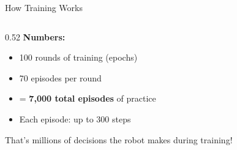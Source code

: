 \documentclass[aspectratio=169, 11pt]{beamer}
\begin{document}
\begin{frame}{How Training Works}
\begin{columns}[T]
\begin{column}{0.52\textwidth}
      \vspace{0.3em}
      \textbf{Numbers:}
      \begin{itemize}\small
        \item 100 rounds of training (epochs)
        \item 70 episodes per round
        \item = \textbf{7,000 total episodes} of practice
        \item Each episode: up to 300 steps
      \end{itemize}

      \vspace{0.2em}
      {\small\color{upecgray}
        That's millions of decisions the robot makes during training!}
    \end{column}
  \end{columns}
\end{frame}
\end{document}
